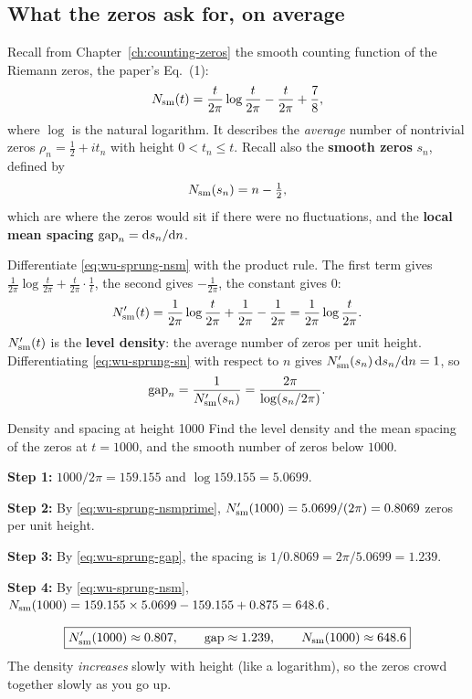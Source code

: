 \subsection{What the zeros ask for, on average}

Recall from Chapter~\ref{ch:counting-zeros} the smooth counting function of the Riemann zeros, the paper's Eq.~(1):
\begin{equation}
N_{\mathrm{sm}}(t)=\frac{t}{2\pi}\log\frac{t}{2\pi}-\frac{t}{2\pi}+\frac78 ,
\label{eq:wu-sprung-nsm}
\end{equation}
where $\log$ is the natural logarithm. It describes the \emph{average} number of nontrivial zeros $\rho_n=\tfrac12+it_n$ with height $0<t_n\le t$. Recall also the \textbf{smooth zeros} $s_n$, defined by
\begin{equation}
N_{\mathrm{sm}}(s_n)=n-\tfrac12 ,
\label{eq:wu-sprung-sn}
\end{equation}
which are where the zeros would sit if there were no fluctuations, and the \textbf{local mean spacing} $\mathrm{gap}_n=\mathrm{d} s_n/\mathrm{d} n$.

Differentiate \eqref{eq:wu-sprung-nsm} with the product rule. The first term gives $\frac{1}{2\pi}\log\frac{t}{2\pi}+\frac{t}{2\pi}\cdot\frac1t$, the second gives $-\frac1{2\pi}$, the constant gives $0$:
\begin{equation}
N_{\mathrm{sm}}'(t)=\frac{1}{2\pi}\log\frac{t}{2\pi}+\frac1{2\pi}-\frac1{2\pi}=\frac{1}{2\pi}\log\frac{t}{2\pi}.
\label{eq:wu-sprung-nsmprime}
\end{equation}
$N_{\mathrm{sm}}'(t)$ is the \textbf{level density}: the average number of zeros per unit height. Differentiating \eqref{eq:wu-sprung-sn} with respect to $n$ gives $N_{\mathrm{sm}}'(s_n)\,\mathrm{d} s_n/\mathrm{d} n=1$, so
\begin{equation}
\mathrm{gap}_n=\frac{1}{N_{\mathrm{sm}}'(s_n)}=\frac{2\pi}{\log(s_n/2\pi)} .
\label{eq:wu-sprung-gap}
\end{equation}

\begin{sample}{Density and spacing at height 1000}
Find the level density and the mean spacing of the zeros at $t=1000$, and the smooth number of zeros below $1000$.

\textbf{Step 1:} $1000/2\pi=159.155$ and $\log 159.155=5.0699$.

\textbf{Step 2:} By \eqref{eq:wu-sprung-nsmprime}, $N_{\mathrm{sm}}'(1000)=5.0699/(2\pi)=0.8069$ zeros per unit height.

\textbf{Step 3:} By \eqref{eq:wu-sprung-gap}, the spacing is $1/0.8069=2\pi/5.0699=1.239$.

\textbf{Step 4:} By \eqref{eq:wu-sprung-nsm}, $N_{\mathrm{sm}}(1000)=159.155\times5.0699-159.155+0.875=648.6$.

\[
\boxed{N_{\mathrm{sm}}'(1000)\approx0.807,\qquad \mathrm{gap}\approx1.239,\qquad N_{\mathrm{sm}}(1000)\approx648.6}
\]
The density \emph{increases} slowly with height (like a logarithm), so the zeros crowd together slowly as you go up.
\end{sample}

